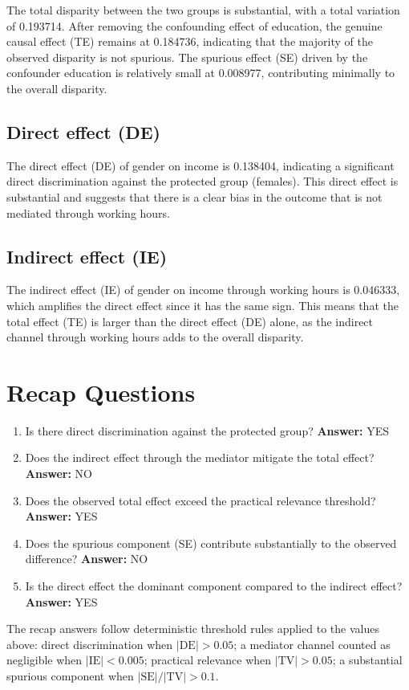 \documentclass[11pt]{article}
\begin{document}
The total disparity between the two groups is substantial, with a total variation of 0.193714. After removing the confounding effect of education, the genuine causal effect (TE) remains at 0.184736, indicating that the majority of the observed disparity is not spurious. The spurious effect (SE) driven by the confounder education is relatively small at 0.008977, contributing minimally to the overall disparity.

\subsection{Direct effect (DE)}

The direct effect (DE) of gender on income is 0.138404, indicating a significant direct discrimination against the protected group (females). This direct effect is substantial and suggests that there is a clear bias in the outcome that is not mediated through working hours.

\subsection{Indirect effect (IE)}

The indirect effect (IE) of gender on income through working hours is 0.046333, which amplifies the direct effect since it has the same sign. This means that the total effect (TE) is larger than the direct effect (DE) alone, as the indirect channel through working hours adds to the overall disparity.

\section{Recap Questions}

\begin{enumerate}
\item Is there direct discrimination against the protected group? \textbf{Answer:} YES
\item Does the indirect effect through the mediator mitigate the total effect? \textbf{Answer:} NO
\item Does the observed total effect exceed the practical relevance threshold? \textbf{Answer:} YES
\item Does the spurious component (SE) contribute substantially to the observed difference? \textbf{Answer:} NO
\item Is the direct effect the dominant component compared to the indirect effect? \textbf{Answer:} YES
\end{enumerate}

\vspace{1em}
\noindent\footnotesize
The recap answers follow deterministic threshold rules applied to the values above: direct discrimination when $|\mathrm{DE}| > 0.05$; a mediator channel counted as negligible when $|\mathrm{IE}| < 0.005$; practical relevance when $|\mathrm{TV}| > 0.05$; a substantial spurious component when $|\mathrm{SE}| / |\mathrm{TV}| > 0.1$.
\end{document}
